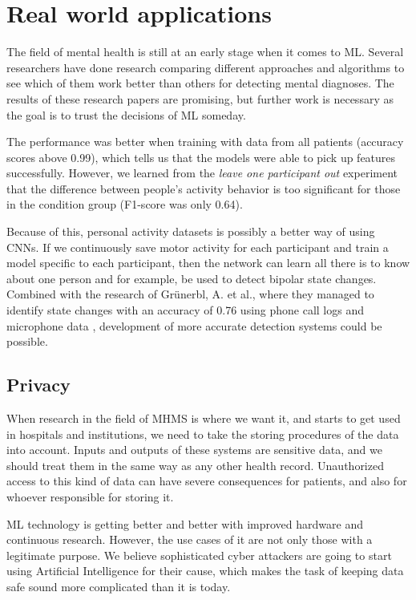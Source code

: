 \section{Real world applications}

The field of mental health is still at an early stage when it comes to ML. Several researchers have done research comparing different approaches and algorithms to see which of them work better than others for detecting mental diagnoses. The results of these research papers are promising, but further work is necessary as the goal is to trust the decisions of ML someday. 

The performance was better when training with data from all patients (accuracy scores above 0.99), which tells us that the models were able to pick up features successfully. However, we learned from the \textit{leave one participant out} experiment that the difference between people's activity behavior is too significant for those in the condition group (F1-score was only 0.64). 

Because of this, personal activity datasets is possibly a better way of using CNNs. If we continuously save motor activity for each participant and train a model specific to each participant, then the network can learn all there is to know about one person and for example, be used to detect bipolar state changes. Combined with the research of Grünerbl, A. et al., where they managed to identify state changes with an accuracy of 0.76 using phone call logs and microphone data \cite{grunerbl_smartphone_bipolar}, development of more accurate detection systems could be possible.

\subsection{Privacy}
When research in the field of MHMS is where we want it, and starts to get used in hospitals and institutions, we need to take the storing procedures of the data into account. Inputs and outputs of these systems are sensitive data, and we should treat them in the same way as any other health record. Unauthorized access to this kind of data can have severe consequences for patients, and also for whoever responsible for storing it. 

ML technology is getting better and better with improved hardware and continuous research. However, the use cases of it are not only those with a legitimate purpose. We believe sophisticated cyber attackers are going to start using Artificial Intelligence for their cause, which makes the task of keeping data safe sound more complicated than it is today. 

